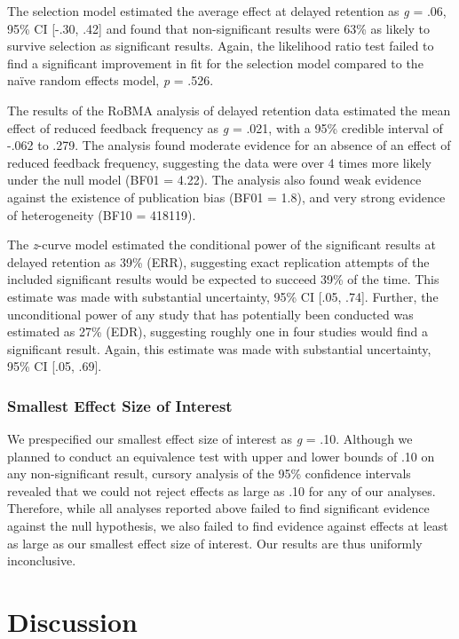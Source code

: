 \documentclass[
  english,
  man, donotrepeattitle,mask,floatsintext]{apa7}
\begin{document}
The selection model estimated the average effect at delayed retention as \emph{g} = .06, 95\% CI {[}-.30, .42{]} and found that non-significant results were 63\% as likely to survive selection as significant results. Again, the likelihood ratio test failed to find a significant improvement in fit for the selection model compared to the naïve random effects model, \emph{p} = .526.

The results of the RoBMA analysis of delayed retention data estimated the mean effect of reduced feedback frequency as \emph{g} = .021, with a 95\% credible interval of -.062 to .279. The analysis found moderate evidence for an absence of an effect of reduced feedback frequency, suggesting the data were over 4 times more likely under the null model (BF01 = 4.22). The analysis also found weak evidence against the existence of publication bias (BF01 = 1.8), and very strong evidence of heterogeneity (BF10 = 418119).

The \emph{z}-curve model estimated the conditional power of the significant results at delayed retention as 39\% (ERR), suggesting exact replication attempts of the included significant results would be expected to succeed 39\% of the time. This estimate was made with substantial uncertainty, 95\% CI {[}.05, .74{]}. Further, the unconditional power of any study that has potentially been conducted was estimated as 27\% (EDR), suggesting roughly one in four studies would find a significant result. Again, this estimate was made with substantial uncertainty, 95\% CI {[}.05, .69{]}.

\hypertarget{smallest-effect-size-of-interest}{%
\subsubsection{Smallest Effect Size of Interest}\label{smallest-effect-size-of-interest}}

We prespecified our smallest effect size of interest as \emph{g} = .10. Although we planned to conduct an equivalence test with upper and lower bounds of .10 on any non-significant result, cursory analysis of the 95\% confidence intervals revealed that we could not reject effects as large as .10 for any of our analyses. Therefore, while all analyses reported above failed to find significant evidence against the null hypothesis, we also failed to find evidence against effects at least as large as our smallest effect size of interest. Our results are thus uniformly inconclusive.

\hypertarget{discussion}{%
\section{Discussion}\label{discussion}}
\end{document}
